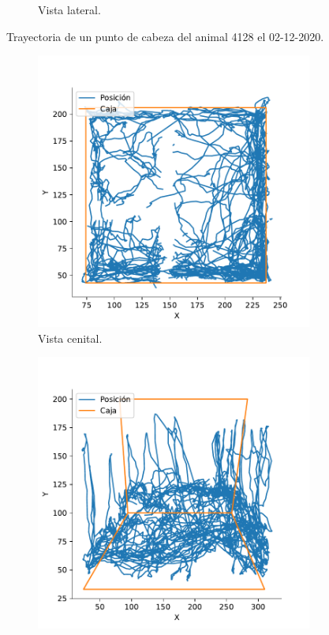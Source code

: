 \begin{figure}[H]
\begin{subfigure}{0.45\textwidth}
    \caption{Vista lateral.}
  \end{subfigure}
  \caption{Trayectoria de un punto de cabeza del animal 4128 el 02-12-2020.}
  \label{fig:raw-trayectories}
\end{figure}

\begin{figure}[H]
  \centering
  \begin{subfigure}{0.45\textwidth}
    \centering
    \includegraphics[width=\textwidth]{figures/filtered-trayectory-top-4128-2020-12-02.pdf}
    \caption{Vista cenital.}
  \end{subfigure}
  \begin{subfigure}{0.45\textwidth}
    \centering
    \includegraphics[width=\textwidth]{figures/filtered-trayectory-lateral-4128-2020-12-02.pdf}

\end{subfigure}
\end{figure}
